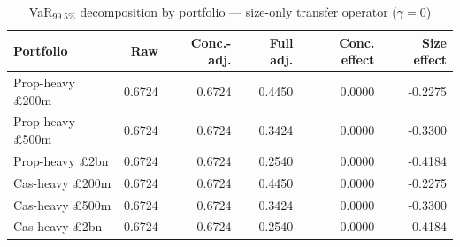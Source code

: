 \begin{table}[htbp]
\centering
\caption{VaR$_{99.5\%}$ decomposition by portfolio --- size-only transfer operator ($\gamma=0$)}
\label{tab:var_decomposition}
\begin{tabular}{lrrrrr}
\toprule
\textbf{Portfolio} & \textbf{Raw} & \textbf{Conc.-adj.} & \textbf{Full adj.} & \textbf{Conc. effect} & \textbf{Size effect} \\
\midrule
Prop-heavy £200m & 0.6724 & 0.6724 & 0.4450 & 0.0000 & -0.2275 \\
Prop-heavy £500m & 0.6724 & 0.6724 & 0.3424 & 0.0000 & -0.3300 \\
Prop-heavy £2bn & 0.6724 & 0.6724 & 0.2540 & 0.0000 & -0.4184 \\
Cas-heavy £200m & 0.6724 & 0.6724 & 0.4450 & 0.0000 & -0.2275 \\
Cas-heavy £500m & 0.6724 & 0.6724 & 0.3424 & 0.0000 & -0.3300 \\
Cas-heavy £2bn & 0.6724 & 0.6724 & 0.2540 & 0.0000 & -0.4184 \\
\bottomrule
\end{tabular}
\end{table}

